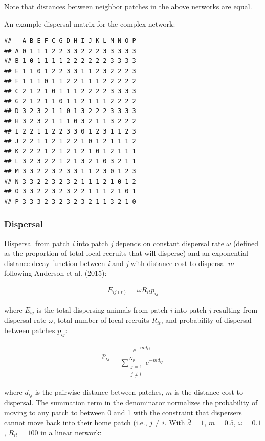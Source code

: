 \documentclass[]{article}
\begin{document}
Note that distances between neighbor patches in the above networks are
equal.

\newpage

An example dispersal matrix for the complex network:

\begin{verbatim}
##   A B E F C G D H I J K L M N O P
## A 0 1 1 1 2 2 3 3 2 2 2 3 3 3 3 3
## B 1 0 1 1 1 1 2 2 2 2 2 2 3 3 3 3
## E 1 1 0 1 2 2 3 3 1 1 2 3 2 2 2 3
## F 1 1 1 0 1 1 2 2 1 1 1 2 2 2 2 2
## C 2 1 2 1 0 1 1 1 2 2 2 2 3 3 3 3
## G 2 1 2 1 1 0 1 1 2 1 1 1 2 2 2 2
## D 3 2 3 2 1 1 0 1 3 2 2 2 3 3 3 3
## H 3 2 3 2 1 1 1 0 3 2 1 1 3 2 2 2
## I 2 2 1 1 2 2 3 3 0 1 2 3 1 1 2 3
## J 2 2 1 1 2 1 2 2 1 0 1 2 1 1 1 2
## K 2 2 2 1 2 1 2 1 2 1 0 1 2 1 1 1
## L 3 2 3 2 2 1 2 1 3 2 1 0 3 2 1 1
## M 3 3 2 2 3 2 3 3 1 1 2 3 0 1 2 3
## N 3 3 2 2 3 2 3 2 1 1 1 2 1 0 1 2
## O 3 3 2 2 3 2 3 2 2 1 1 1 2 1 0 1
## P 3 3 3 2 3 2 3 2 3 2 1 1 3 2 1 0
\end{verbatim}

\hypertarget{dispersal}{%
\subsubsection{Dispersal}\label{dispersal}}

Dispersal from patch \emph{i} into patch \emph{j} depends on constant
dispersal rate \(\omega\) (defined as the proportion of total local
recruits that will disperse) and an exponential distance-decay function
between \emph{i} and \emph{j} with distance cost to dispersal \(m\)
following Anderson et al. (2015):

\begin{align}
E_{ij(t)}=\omega R_{it}p_{ij}
\end{align}

where \(E_{ij}\) is the total dispersing animals from patch \emph{i}
into patch \emph{j} resulting from dispersal rate \(\omega\), total
number of local recruits \(R_{it}\), and probability of dispersal
between patches \(p_{ij}\):

\begin{align}
p_{ij}=\dfrac{e^{-md_{ij}}}{\sum\limits_{\substack{j=1 \\ j\neq i}}^{N_p} e^{-md_{ij}}}
\end{align}

where \(d_{ij}\) is the pairwise distance between patches, \(m\) is the
distance cost to dispersal. The summation term in the denominator
normalizes the probability of moving to any patch to between 0 and 1
with the constraint that dispersers cannot move back into their home
patch (i.e., \(j\neq i\). With \(\bar{d}= 1\), \(m=0.5\),
\(\omega=0.1\), \(R_{it}=100\) in a linear network:
\end{document}
